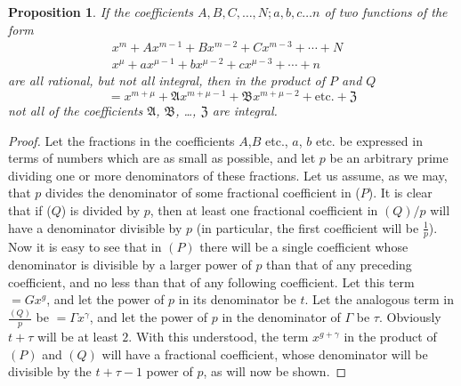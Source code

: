 \documentclass{book}
\theoremstyle{plain}
\newtheorem{proposition}{Proposition}
\theoremstyle{remark}
\begin{document}
\begin{proposition} If the coefficients $A,B,C,\dots, N ; a,b,c \dots n$ of two functions of the form
\begin{align} x^m + A x^{m-1} + B x^{m-2} + Cx^{m-3} + \cdots + N & \tag{$P$} \\
x^{\mu} + a x^{\mu-1} + bx^{\mu-2} + cx^{\mu-3} + \cdots + n & \tag{$Q$} \end{align}
are all rational, but not all integral, then in the product of $P$ and $Q$ 
\[ = x^{m+\mu} + \mathfrak{A} x^{m+\mu-1} + \mathfrak{B} x^{m+\mu - 2} + \textrm{etc.} + \mathfrak{Z} \]
not all of the coefficients $\mathfrak{A}$, $\mathfrak{B}$, \dots, $\mathfrak{Z}$ are integral.
\end{proposition}
\begin{proof}
Let the fractions in the coefficients $A$,$B$ etc., $a$, $b$ etc. be expressed in terms of numbers which are as small as possible, and let $p$ be an arbitrary prime dividing one or more denominators of these fractions.  Let us assume, as we may, that $p$ divides the denominator of some fractional coefficient in ($P$).  It is clear that if ($Q$) is divided by $p$, then at least one fractional coefficient in $(Q)/p$ will have a denominator divisible by $p$ (in particular, the first coefficient will be $\frac{1}{p}$).  Now it is easy to see that in $(P)$ there will be a single coefficient whose denominator is divisible by a larger power of $p$ than that of any preceding coefficient, and no less than that of any following coefficient.  Let this term $=Gx^g$, and let the power of $p$ in its denominator be $t$. Let the analogous term in $\frac{(Q)}{p}$ be $=\Gamma x^{\gamma}$, and let the power of $p$ in the denominator of $\Gamma$ be $\tau$.   Obviously $t + \tau$ will be at least $2$.  With this understood, the term $x^{g+\gamma}$ in the product of $(P)$ and $(Q)$ will have a fractional coefficient, whose denominator will be divisible by the $t + \tau - 1$ power of $p$, as will now be shown.


\end{proof}
\end{document}
